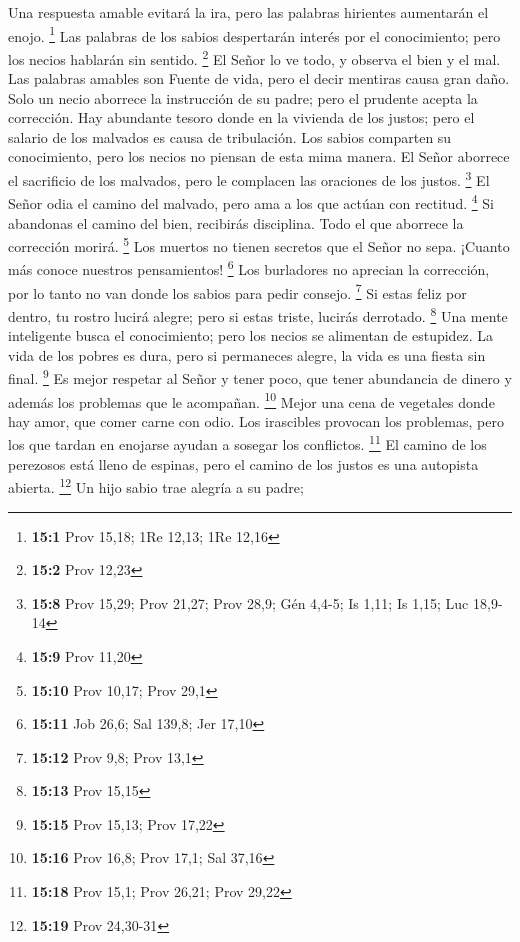  Una respuesta amable evitará la ira, pero las palabras
hirientes aumentarán el enojo. \footnote{\textbf{15:1} Prov 15,18; 1Re
  12,13; 1Re 12,16}  Las palabras de los sabios despertarán
interés por el conocimiento; pero los necios hablarán sin sentido.
\footnote{\textbf{15:2} Prov 12,23}  El Señor lo ve todo, y
observa el bien y el mal.  Las palabras amables son Fuente
de vida, pero el decir mentiras causa gran daño.  Solo un
necio aborrece la instrucción de su padre; pero el prudente acepta la
corrección.  Hay abundante tesoro donde en la vivienda de
los justos; pero el salario de los malvados es causa de tribulación.
 Los sabios comparten su conocimiento, pero los necios no
piensan de esta mima manera.  El Señor aborrece el
sacrificio de los malvados, pero le complacen las oraciones de los
justos. \footnote{\textbf{15:8} Prov 15,29; Prov 21,27; Prov 28,9; Gén
  4,4-5; Is 1,11; Is 1,15; Luc 18,9-14}  El Señor odia el
camino del malvado, pero ama a los que actúan con rectitud. \footnote{\textbf{15:9}
  Prov 11,20}  Si abandonas el camino del bien, recibirás
disciplina. Todo el que aborrece la corrección morirá. \footnote{\textbf{15:10}
  Prov 10,17; Prov 29,1}  Los muertos no tienen secretos
que el Señor no sepa. ¡Cuanto más conoce nuestros pensamientos!
\footnote{\textbf{15:11} Job 26,6; Sal 139,8; Jer 17,10} 
Los burladores no aprecian la corrección, por lo tanto no van donde los
sabios para pedir consejo. \footnote{\textbf{15:12} Prov 9,8; Prov 13,1}
 Si estas feliz por dentro, tu rostro lucirá alegre; pero
si estas triste, lucirás derrotado. \footnote{\textbf{15:13} Prov 15,15}
 Una mente inteligente busca el conocimiento; pero los
necios se alimentan de estupidez.  La vida de los pobres es
dura, pero si permaneces alegre, la vida es una fiesta sin final.
\footnote{\textbf{15:15} Prov 15,13; Prov 17,22}  Es mejor
respetar al Señor y tener poco, que tener abundancia de dinero y además
los problemas que le acompañan. \footnote{\textbf{15:16} Prov 16,8; Prov
  17,1; Sal 37,16}  Mejor una cena de vegetales donde hay
amor, que comer carne con odio.  Los irascibles provocan
los problemas, pero los que tardan en enojarse ayudan a sosegar los
conflictos. \footnote{\textbf{15:18} Prov 15,1; Prov 26,21; Prov 29,22}
 El camino de los perezosos está lleno de espinas, pero el
camino de los justos es una autopista abierta. \footnote{\textbf{15:19}
  Prov 24,30-31}  Un hijo sabio trae alegría a su padre;
